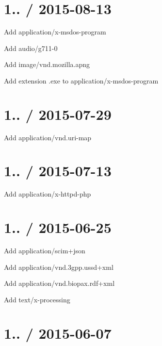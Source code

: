 \section*{1.. / 2015-\/08-\/13 }


\begin{DoxyItemize}
\item Add {\ttfamily application/x-\/msdos-\/program}
\item Add {\ttfamily audio/g711-\/0}
\item Add {\ttfamily image/vnd.\+mozilla.\+apng}
\item Add extension {\ttfamily .exe} to {\ttfamily application/x-\/msdos-\/program}
\end{DoxyItemize}

\section*{1.. / 2015-\/07-\/29 }


\begin{DoxyItemize}
\item Add {\ttfamily application/vnd.\+uri-\/map}
\end{DoxyItemize}

\section*{1.. / 2015-\/07-\/13 }


\begin{DoxyItemize}
\item Add {\ttfamily application/x-\/httpd-\/php}
\end{DoxyItemize}

\section*{1.. / 2015-\/06-\/25 }


\begin{DoxyItemize}
\item Add {\ttfamily application/scim+json}
\item Add {\ttfamily application/vnd.\+3gpp.\+ussd+xml}
\item Add {\ttfamily application/vnd.\+biopax.\+rdf+xml}
\item Add {\ttfamily text/x-\/processing}
\end{DoxyItemize}

\section*{1.. / 2015-\/06-\/07 }


